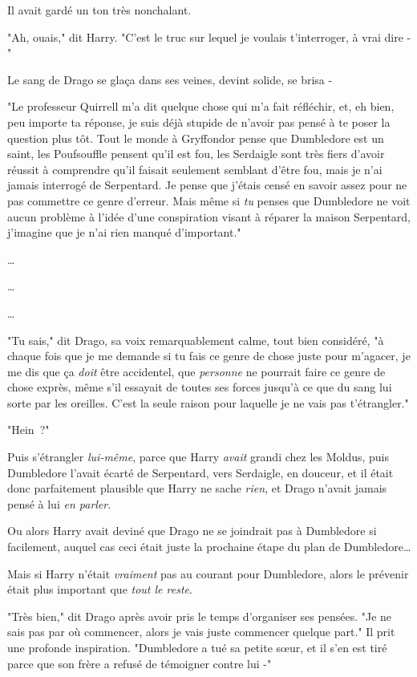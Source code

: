Il avait gardé un ton très nonchalant.

"Ah, ouais," dit Harry. "C'est le truc sur lequel je voulais t'interroger, à vrai dire -"

Le sang de Drago se glaça dans ses veines, devint solide, se brisa -

"Le professeur Quirrell m'a dit quelque chose qui m'a fait réfléchir, et, eh bien, peu importe ta réponse, je suis déjà stupide de n'avoir pas pensé à te poser la question plus tôt. Tout le monde à Gryffondor pense que Dumbledore est un saint, les Poufsouffle pensent qu'il est fou, les Serdaigle sont très fiers d'avoir réussit à comprendre qu'il faisait seulement semblant d'être fou, mais je n'ai jamais interrogé de Serpentard. Je pense que j'étais censé en savoir assez pour ne pas commettre ce genre d'erreur. Mais même si \emph{tu} penses que Dumbledore ne voit aucun problème à l'idée d'une conspiration visant à réparer la maison Serpentard, j'imagine que je n'ai rien manqué d'important."

…

…

…

"Tu sais," dit Drago, sa voix remarquablement calme, tout bien considéré, "à chaque fois que je me demande si tu fais ce genre de chose juste pour m'agacer, je me dis que ça \emph{doit} être accidentel, que \emph{personne} ne pourrait faire ce genre de chose exprès, même s'il essayait de toutes ses forces jusqu'à ce que du sang lui sorte par les oreilles. C'est la seule raison pour laquelle je ne vais pas t'étrangler."

"Hein~?"

Puis s'étrangler \emph{lui-même}, parce que Harry \emph{avait} grandi chez les Moldus, puis Dumbledore l'avait écarté de Serpentard, vers Serdaigle, en douceur, et il était donc parfaitement plausible que Harry ne sache \emph{rien}, et Drago n'avait jamais pensé à lui \emph{en parler}.

Ou alors Harry avait deviné que Drago ne se joindrait pas à Dumbledore si facilement, auquel cas ceci était juste la prochaine étape du plan de Dumbledore…

Mais si Harry n'était \emph{vraiment} pas au courant pour Dumbledore, alors le prévenir était plus important que \emph{tout le reste}.

"Très bien," dit Drago après avoir pris le temps d'organiser ses pensées. "Je ne sais pas par où commencer, alors je vais juste commencer quelque part." Il prit une profonde inspiration. "Dumbledore a tué sa petite sœur, et il s'en est tiré parce que son frère a refusé de témoigner contre lui -"


